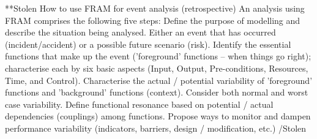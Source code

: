 **Stolen
How to use FRAM for event analysis (retrospective)
An analysis using FRAM comprises the following five steps:
Define the purpose of modelling and describe the situation being analysed. Either an event that has occurred (incident/accident) or a possible future scenario (risk).
Identify the essential functions that make up the event ('foreground' functions – when things go right); characterise each by six basic aspects (Input, Output, Pre-conditions, Resources, Time, and Control). 
Characterise the actual / potential variability of 'foreground' functions and 'background' functions (context). Consider both normal and worst case variability.
Define functional resonance based on potential  / actual dependencies (couplings) among functions.
Propose ways to monitor and dampen performance variability (indicators, barriers, design / modification, etc.)
/Stolen